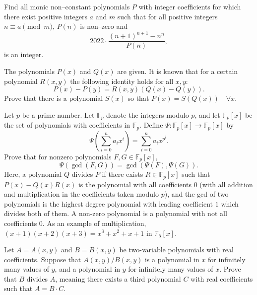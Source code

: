 \begin{question}[name={2022 ELMO}]
    Find all monic non--constant polynomials $P$ with integer coefficients for which there exist positive integers $a$ and $m$ such that for all positive integers $n\equiv a\pmod m$, $P(n)$ is non--zero and $$2022\cdot\frac{(n+1)^{n+1} - n^n}{P(n)},$$ is an integer.
\end{question}



\begin{question}[name={2004 Russia}]
    The polynomials $P(x)$ and $Q(x)$ are given. It is known that for a certain polynomial $R(x, y)$ the following identity holds for all $x,y$: \[P(x) - P(y) = R(x, y) (Q(x) - Q(y)).\] Prove that there is a polynomial $S(x)$ so that $ P(x) = S(Q(x)) \quad \forall x$.
\end{question}


\begin{question}[name={2016 USA TST}]
    Let $p$ be a prime number. Let $\mathbb F_p$ denote the integers modulo $p$, and let $\mathbb F_p[x]$ be the set of polynomials with coefficients in $\mathbb F_p$. Define $\Psi : \mathbb F_p[x] \to \mathbb F_p[x]$ by\[ \Psi\left( \sum_{i=0}^n a_i x^i \right) = \sum_{i=0}^n a_i x^{p^i}. \]Prove that for nonzero polynomials $F,G \in \mathbb F_p[x]$,\[ \Psi(\gcd(F,G)) = \gcd(\Psi(F), \Psi(G)). \]Here, a polynomial $Q$ divides $P$ if there exists $R \in \mathbb F_p[x]$ such that $P(x) - Q(x) R(x)$ is the polynomial with all coefficients $0$ (with all addition and multiplication in the coefficients taken modulo $p$), and the gcd of two polynomials is the highest degree polynomial with leading coefficient $1$ which divides both of them. A non-zero polynomial is a polynomial with not all coefficients $0$. As an example of multiplication, $(x+1)(x+2)(x+3) = x^3+x^2+x+1$ in $\mathbb F_5[x]$.
\end{question}

\begin{question}[name={2016 USA TSTST}]
    Let $A = A(x,y)$ and $B = B(x,y)$ be two-variable polynomials with real coefficients. Suppose that $A(x,y)/B(x,y)$ is a polynomial in $x$ for infinitely many values of $y$, and a polynomial in $y$ for infinitely many values of $x$. Prove that $B$ divides $A$, meaning there exists a third polynomial $C$ with real coefficients such that $A = B \cdot C$.
\end{question}


